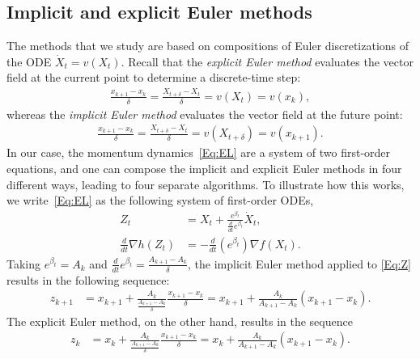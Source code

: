 \documentclass[11pt]{article}
\theoremstyle{plain}
\begin{document}
 \subsection{Implicit and explicit Euler methods}
The methods that we study are based on compositions of Euler discretizations of the ODE $ \dot X_t = v(X_t)$.  Recall that the \emph{explicit Euler method} evaluates the vector field at the current point to determine a discrete-time step:
\begin{align*}
\frac{x_{k+1} - x_k}{\delta} = \frac{X_{t+ \delta} - X_t}{\delta}= v(X_t) = v(x_k),
\end{align*}
whereas the \emph{implicit Euler method} evaluates the vector field at the future point:
\begin{align*}
\frac{x_{k+1} - x_k}{\delta} = \frac{X_{t+ \delta} - X_t}{\delta}= v(X_{t+\delta}) = v(x_{k+1}).
\end{align*}
In our case, the momentum dynamics~\eqref{Eq:EL} are a system of two first-order equations, and one can compose the implicit and explicit Euler methods in four different ways, leading to four separate algorithms. To illustrate how this works, we write~\eqref{Eq:EL} as the following system of first-order ODEs,
 \begin{subequations}\label{Eq:DynaBeta}
 \begin{align}
 Z_t &= X_t + \frac{e^{\beta_t}}{\frac{d}{dt} e^{\beta_t}} \dot X_t, \label{Eq:Z}\\
 \frac{d}{dt} \nabla h(Z_t) &= -\frac{d}{dt}\left(e^{\beta_t}\right) \nabla f(X_t). \label{Eq:X}
 \end{align}
 \end{subequations}
 Taking $e^{\beta_t} = A_k$ and $\frac{d}{dt}e^{\beta_t} =\frac{A_{k+1} - A_k}{\delta}$, the implicit Euler method applied to \eqref{Eq:Z} results in the following sequence:
 \begin{align*}
 z_{k+1} &= x_{k+1} + \frac{A_k}{\frac{A_{k+1} - A_k}{\delta}} \frac{x_{k+1} - x_k}{\delta}=  x_{k+1} + \frac{A_k}{A_{k+1} - A_k} (x_{k+1} - x_k).
 \end{align*}
The explicit Euler method, on the other hand, results in the sequence 
\begin{align*}
 z_{k} &= x_{k} + \frac{A_k}{\frac{A_{k+1} - A_k}{\delta}} \frac{x_{k+1} - x_k}{\delta}=  x_{k} + \frac{A_k}{A_{k+1} - A_k} (x_{k+1} - x_k).
\end{align*}
\end{document}
